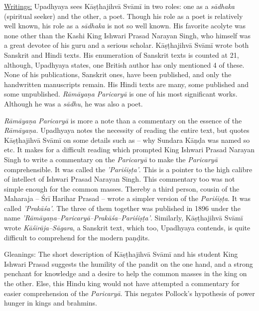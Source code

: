 \underline{Writings:} Upadhyaya sees Kāṣṭhajihvā Svāmī in two roles: one as a \textit{sādhaka} (spiritual seeker) and the other, a poet. Though his role as a poet is relatively well known, his role as a \textit{sādhaka} is not so well known. His favorite acolyte was none other than the Kashi King Ishwari Prasad Narayan Singh, who himself was a great devotee of his guru and a serious scholar. Kāṣṭhajihvā Svāmī wrote both Sanskrit and Hindi texts. His enumeration of Sanskrit texts is counted at 21, although, Upadhyaya states, one British author has only mentioned 4 of these. None of his publications, Sanskrit ones, have been published, and only the handwritten manuscripts remain. His Hindi texts are many, some published and some unpublished. \textit{Rāmāyaṇa Paricaryā} is one of his most significant works. Although he was a \textit{sādhu}, he was also a poet.

\textit{Rāmāyaṇa Paricaryā} is more a note than a commentary on the essence of the \textit{Rāmāyaṇa.} Upadhyaya notes the necessity of reading the entire text, but quotes Kāṣṭhajihvā Svāmī on some details such as – why Sundara Kāṇḍa was named so etc. It makes for a difficult reading which prompted King Ishwari Prasad Narayan Singh to write a commentary on the \textit{Paricaryā} to make the \textit{Paricaryā} comprehensible. It was called the \textit{'Pariśiṣṭa'}. This is a pointer to the high calibre of intellect of Ishwari Prasad Narayan Singh. This commentary too was not simple enough for the common masses. Thereby a third person, cousin of the Maharaja – Śrī Harihar Prasad – wrote a simpler version of the \textit{Pariśiṣṭa}. It was called \textit{'Prakāśa'}. The three of them together was published in 1896 under the name \textit{'Rāmāyaṇa–Paricaryā–Prakāśa–Pariśiṣṭa'}. Similarly, Kāṣṭhajihvā Svāmī wrote \textit{Kāśīrāja–Sāgara}, a Sanskrit text, which too, Upadhyaya contends, is quite difficult to comprehend for the modern paṇḍits.

Gleanings: The short description of Kāṣṭhajihvā Svāmī and his student King Ishwari Prasad suggests the humility of the pandit on the one hand, and a strong penchant for knowledge and a desire to help the common masses in the king on the other. Else, this Hindu king would not have attempted a commentary for easier comprehension of the \textit{Paricaryā}. This negates Pollock’s hypothesis of power hunger in kings and brahmins.

